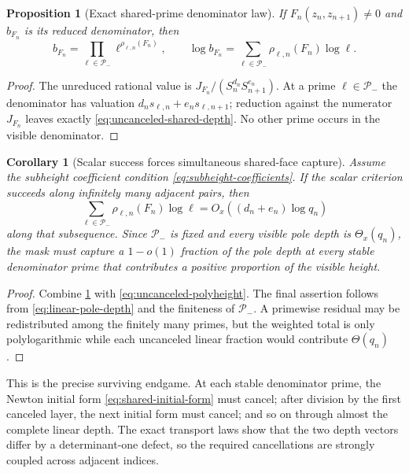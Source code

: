 \documentclass[11pt,oneside]{article}
\newtheorem{proposition}[theorem]{Proposition}
\newtheorem{corollary}[theorem]{Corollary}
\theoremstyle{definition}
\theoremstyle{remark}
\begin{document}
\begin{proposition}[Exact shared-prime denominator law]
\label{prop:exact-shared-denominator}
If $F_n(z_n,z_{n+1})\ne0$ and $b_{F_n}$ is its reduced denominator, then
\begin{equation}
 b_{F_n}=\prod_{\ell\in\mathcal P_-}\ell^{\rho_{\ell,n}(F_n)},
 \qquad
 \log b_{F_n}
 =\sum_{\ell\in\mathcal P_-}\rho_{\ell,n}(F_n)\log\ell.
 \label{eq:exact-shared-denominator}
\end{equation}
\end{proposition}

\begin{proof}
The unreduced rational value is $J_{F_n}/(S_n^{d_n}S_{n+1}^{e_n})$.  At a prime
$\ell\in\mathcal P_-$ the denominator has valuation
$d_ns_{\ell,n}+e_ns_{\ell,n+1}$; reduction against the numerator $J_{F_n}$ leaves exactly
\eqref{eq:uncanceled-shared-depth}.  No other prime occurs in the visible denominator.
\end{proof}

\begin{corollary}[Scalar success forces simultaneous shared-face capture]
\label{cor:primewise-capture-forced}
Assume the subheight coefficient condition \eqref{eq:subheight-coefficients}.  If the scalar
criterion succeeds along infinitely many adjacent pairs, then
\begin{equation}
 \sum_{\ell\in\mathcal P_-}\rho_{\ell,n}(F_n)\log\ell
 =O_x((d_n+e_n)\log q_n)
 \label{eq:shared-residual-polyheight}
\end{equation}
along that subsequence.  Since $\mathcal P_-$ is fixed and every visible pole depth is
$\Theta_x(q_n)$, the mask must capture a $1-o(1)$ fraction of the pole depth at every stable
denominator prime that contributes a positive proportion of the visible height.
\end{corollary}

\begin{proof}
Combine \cref{prop:exact-shared-denominator} with
\eqref{eq:uncanceled-polyheight}.  The final assertion follows from
\eqref{eq:linear-pole-depth} and the finiteness of $\mathcal P_-$.  A primewise residual may
be redistributed among the finitely many primes, but the weighted total is only
polylogarithmic while each uncanceled linear fraction would contribute $\Theta(q_n)$.
\end{proof}

This is the precise surviving endgame.  At each stable denominator prime, the Newton initial
form \eqref{eq:shared-initial-form} must cancel; after division by the first canceled layer,
the next initial form must cancel; and so on through almost the complete linear depth.  The
exact transport laws show that the two depth vectors differ by a determinant-one defect, so
the required cancellations are strongly coupled across adjacent indices.
\end{document}
